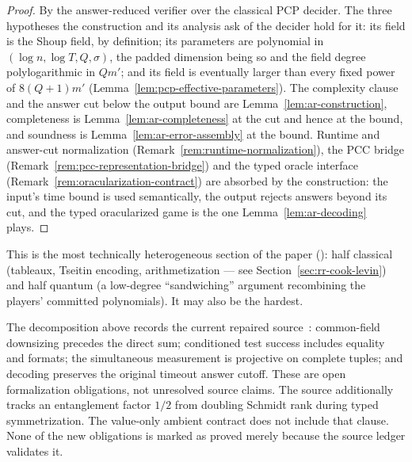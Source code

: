 \begin{proof}
\leanok
By the answer-reduced verifier over the classical PCP decider. The three hypotheses the
construction and its analysis ask of the decider hold for it: its field is the Shoup field, by
definition; its parameters are polynomial in $(\log n,\log T,Q,\sigma)$, the padded dimension
being so and the field degree polylogarithmic in $Qm'$; and its field is eventually larger than
every fixed power of $8(Q+1)m'$ (Lemma~\ref{lem:pcp-effective-parameters}). The complexity clause
and the answer cut below the output bound are Lemma~\ref{lem:ar-construction}, completeness is
Lemma~\ref{lem:ar-completeness} at the cut and hence at the bound, and soundness is
Lemma~\ref{lem:ar-error-assembly} at the bound. Runtime and answer-cut normalization
(Remark~\ref{rem:runtime-normalization}), the PCC bridge
(Remark~\ref{rem:pcc-representation-bridge}) and the typed oracle interface
(Remark~\ref{rem:oracularization-contract}) are absorbed by the construction: the input's time bound
is used semantically, the output rejects answers beyond its cut, and the typed oracularized
game is the one Lemma~\ref{lem:ar-decoding} plays.
\end{proof}

This is the most technically heterogeneous section of the paper
(\cite[Section 10]{JNVWY20}): half classical (tableaux, Tseitin encoding,
arithmetization --- see Section~\ref{sec:rr-cook-levin}) and half quantum (a
low-degree ``sandwiching'' argument recombining the players' committed polynomials). It may also be the hardest. 

\begin{remark}
\label{rem:ar-composition}
The decomposition above records the current repaired source~\cite{AuditSync26}:
common-field downsizing precedes the direct sum; conditioned test success
includes equality and formats; the simultaneous measurement is projective on
complete tuples; and decoding preserves the original timeout answer cutoff.
These are open formalization obligations, not unresolved source claims.
The source additionally tracks an entanglement factor $1/2$ from doubling
Schmidt rank during typed symmetrization. The value-only ambient contract
does not include that clause. None of the new obligations is marked as
proved merely because the source ledger validates it.
\end{remark}

